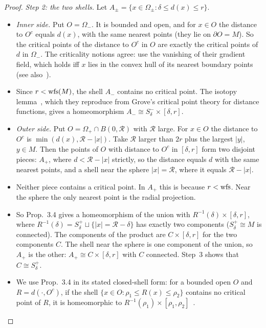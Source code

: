 \begin{proof}
\emph{Step 2: the two shells.} Let $A_\pm=\{x\in\Omega_\pm:\delta\le d(x)\le r\}$.
\begin{itemize}
\item \emph{Inner side.} Put $O=\Omega_-$. It is bounded and open, and for $x\in O$ the distance to $O^c$ equals
$d(x)$, with the same nearest points (they lie on $\partial O=M$). So the critical points of the distance to $O^c$
in $O$ are exactly the critical points of $d$ in $\Omega_-$. The criticality notions agree:
\cite{ChazalLieutier07} use the vanishing of their gradient field, which holds iff $x$ lies in the convex hull of
its nearest boundary points~\cite[Lemma~2.2]{ChazalLieutier07} (see also~\cite[\S2.2]{CCSL09dcg}).
\item Since $r<\operatorname{wfs}(M)$, the shell $A_-$ contains no critical point. The isotopy lemma~\cite[Prop.~3.4]{ChazalLieutier07}, which they reproduce from
Grove's critical point theory for distance functions, gives a homeomorphism $A_-\cong S^-_\delta\times[\delta,r]$.
\item \emph{Outer side.} Put $O=\Omega_+\cap B(0,\mathcal R)$ with $\mathcal R$ large. For $x\in O$ the distance to
$O^c$ is $\min(d(x),\mathcal R-|x|)$. Take $\mathcal R$ larger than $2r$ plus the largest $|y|$, $y\in M$. Then the
points of $O$ with distance to $O^c$ in $[\delta,r]$ form two disjoint pieces: $A_+$, where $d<\mathcal R-|x|$ strictly, so
the distance equals $d$ with the same nearest points,
and a shell near the sphere $|x|=\mathcal R$, where it equals $\mathcal R-|x|$.
\item Neither piece contains a critical point. In $A_+$ this is because $r<\operatorname{wfs}$. Near the sphere the only nearest
point is the radial projection.
\item So Prop.~3.4 gives a homeomorphism of the union with $R^{-1}(\delta)\times[\delta,r]$, where
$R^{-1}(\delta)=S^+_\delta\sqcup\{|x|=\mathcal R-\delta\}$ has exactly two components ($S^+_\delta\cong M$ is connected).
The components of the product are $C\times[\delta,r]$ for the two components $C$. The shell near the sphere is one
component of the union, so $A_+$ is the other: $A_+\cong C\times[\delta,r]$ with $C$ connected. Step~3 shows that
$C\cong S^+_\delta$.
\item We use Prop.~3.4 in its stated closed-shell form: for a bounded open $O$ and $R=d(\cdot,O^c)$, if the shell
$\{x\in O:\rho_1\le R(x)\le\rho_2\}$ contains no critical point of $R$, it is homeomorphic to
$R^{-1}(\rho_1)\times[\rho_1,\rho_2]$~\cite[Prop.~3.4]{ChazalLieutier07}.
\end{itemize}


\end{proof}
